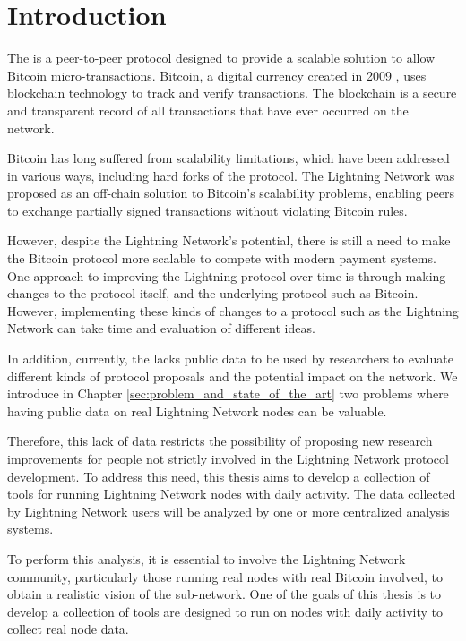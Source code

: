 \setcounter{page}{1}
\chapter*{Introduction}\label{sec:introduction}

The {\LN} \cite{lightning-network-paper} is a peer-to-peer protocol designed to
provide a scalable solution to allow Bitcoin micro-transactions.
Bitcoin, a digital currency created in 2009 \cite{nakamoto2009bitcoin}, uses blockchain technology
to track and verify transactions. The blockchain is a secure and transparent
record of all transactions that have ever occurred on the network.

Bitcoin has long suffered from scalability limitations, which have been
addressed in various ways, including hard forks of the protocol.
The Lightning Network was proposed as an off-chain solution to Bitcoin's
scalability problems, enabling peers to exchange partially signed transactions
without violating Bitcoin rules.

However, despite the Lightning Network's potential, there is still a need
to make the Bitcoin protocol more scalable to compete with modern payment systems.
One approach to improving the Lightning protocol over time is through making changes
to the protocol itself, and the underlying protocol such as Bitcoin. However,
implementing these kinds of changes to a protocol such as the Lightning Network
can take time and evaluation of different ideas.

In addition, currently, the {\LN} lacks public data to be used by researchers
to evaluate different kinds of protocol proposals and the
potential impact on the network. We introduce in Chapter \ref{sec:problem_and_state_of_the_art}
two problems where having public data on real Lightning Network nodes can be valuable.

Therefore, this lack of data restricts the possibility of proposing new research
improvements for people not strictly involved in the Lightning Network protocol development.
To address this need, this thesis aims to develop a collection of tools for
running Lightning Network nodes with daily activity. The data collected by
Lightning Network users will be analyzed by one or more centralized
analysis systems.

To perform this analysis, it is essential to involve the Lightning Network
community, particularly those running real nodes with real Bitcoin involved,
to obtain a realistic vision of the sub-network. 
One of the goals of this thesis is to develop a collection of 
tools are designed to run on nodes with daily activity to 
collect real node data.


